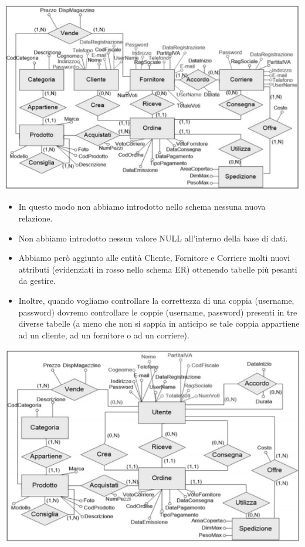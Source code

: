 \begin{center}
	\includegraphics{images/96.PNG}
\end{center}
\begin{itemize}
	\item In questo modo non abbiamo introdotto nello schema
	nessuna nuova relazione. 
	\item Non abbiamo introdotto nessun valore NULL all’interno
	della base di dati. 
	\item Abbiamo però aggiunto alle entità Cliente, Fornitore e Corriere molti nuovi attributi (evidenziati in rosso nello schema ER) ottenendo tabelle più pesanti da gestire. 
	\item Inoltre, quando vogliamo controllare la correttezza di una coppia (username, password) dovremo controllare le coppie (username, password) presenti in tre diverse tabelle (a meno che non si sappia in anticipo se tale coppia appartiene ad un cliente, ad un fornitore o ad un corriere). 
\end{itemize}
\begin{center}
	\includegraphics{images/95.PNG}
\end{center}
